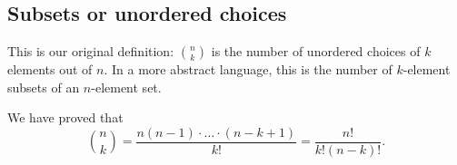 

\setcounter{section}{3}
\setcounter{subsection}{1}
\setcounter{dfn}{0}

\subsection{Subsets or unordered choices}
This is our original definition: $\binom{n}{k}$ is the number of unordered choices of $k$ elements out of $n$.
In a more abstract language, this is the number of $k$-element subsets of an $n$-element set.

We have proved that
\begin{equation}
\label{eqn:NChooseK}
\binom{n}{k} = \frac{n(n-1)\cdot \ldots \cdot (n-k+1)}{k!} = \frac{n!}{k!(n-k)!}.
\end{equation}



